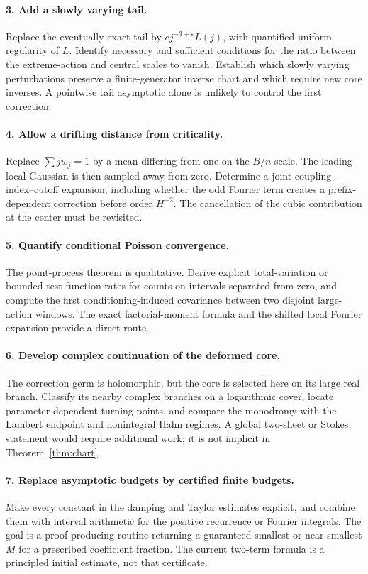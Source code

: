 \documentclass[11pt,a4paper]{article}
\numberwithin{equation}{section}
\theoremstyle{definition}
\theoremstyle{remark}
\newcommand{\eps}{\varepsilon}
\begin{document}
\paragraph{3. Add a slowly varying tail.}
Replace the eventually exact tail by
\(c j^{-3+\eps}L(j)\), with quantified uniform regularity of \(L\).
Identify necessary and sufficient conditions for the ratio between the
extreme-action and central scales to vanish. Establish which slowly varying
perturbations preserve a finite-generator inverse chart and which require
new core inverses. A pointwise tail asymptotic alone is unlikely to control
the first correction.

\paragraph{4. Allow a drifting distance from criticality.}
Replace \(\sum jw_j=1\) by a mean differing from one on the \(B/n\) scale.
The leading local Gaussian is then sampled away from zero. Determine a joint
coupling--index--cutoff expansion, including whether the odd Fourier term
creates a prefix-dependent correction before order \(H^{-2}\).
The cancellation of the cubic contribution at the center must be revisited.

\paragraph{5. Quantify conditional Poisson convergence.}
The point-process theorem is qualitative. Derive explicit total-variation
or bounded-test-function rates for counts on intervals separated from zero,
and compute the first conditioning-induced covariance between two disjoint
large-action windows. The exact factorial-moment formula and the shifted
local Fourier expansion provide a direct route.

\paragraph{6. Develop complex continuation of the deformed core.}
The correction germ is holomorphic, but the core is selected here on its
large real branch. Classify its nearby complex branches on a logarithmic
cover, locate parameter-dependent turning points, and compare the monodromy
with the Lambert endpoint and nonintegral Hahn regimes. A global two-sheet
or Stokes statement would require additional work; it is not implicit in
Theorem~\ref{thm:chart}.

\paragraph{7. Replace asymptotic budgets by certified finite budgets.}
Make every constant in the damping and Taylor estimates explicit, and combine
them with interval arithmetic for the positive recurrence or Fourier
integrals. The goal is a proof-producing routine returning a guaranteed
smallest or near-smallest \(M\) for a prescribed coefficient fraction. The
current two-term formula is a principled initial estimate, not that certificate.
\end{document}
